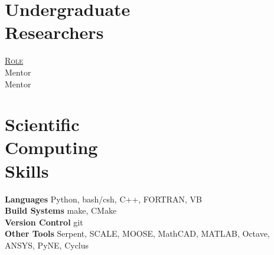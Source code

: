 \documentclass[margin,line]{resume}
\begin{document}
\begin{resume}
    \section{\mysidestyle Undergraduate\\Researchers}
    \hfill\textsc{\underline{Role}}\\
    \hfill Mentor\\
    \hfill Mentor\\
    \section{\mysidestyle Scientific\\Computing\\Skills}
                \textbf{Languages} \hfill Python, bash/csh, C++, FORTRAN, VB \vspace{.5mm}\\%
                \textbf{Build Systems} \hfill make, CMake\vspace{.5mm}\\%
                \textbf{Version Control} \hfill git\vspace{.5mm}\\%
                \textbf{Other Tools} \hfill Serpent, SCALE, MOOSE, MathCAD, MATLAB, Octave, ANSYS, PyNE, Cyclus \vspace{.5mm}%


\end{resume}
\end{document}
